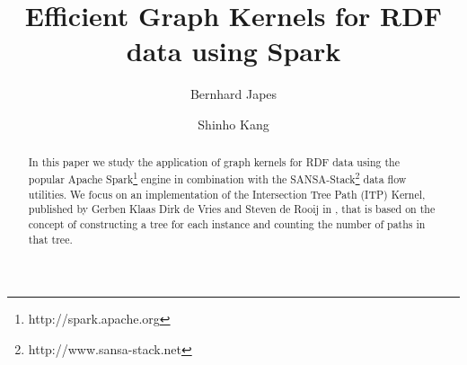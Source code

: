 \documentclass{easychair}
\begin{document}
%
\title{Efficient Graph Kernels for RDF data using Spark}



%
\author{
Bernhard Japes
\and
Shinho Kang
}




\clearpage

\maketitle

\begin{abstract}
In this paper we study the application of graph kernels for RDF data using the popular Apache Spark\footnote{http://spark.apache.org} engine in combination with the SANSA-Stack\footnote{http://www.sansa-stack.net} data flow utilities.
We focus on an implementation of the Intersection Tree Path (ITP) Kernel, published by Gerben Klaas Dirk de Vries and Steven de Rooij in \cite{FGK}, that is based on the concept of constructing a tree for each instance and counting the number of paths in that tree.
\end{abstract}

\setcounter{tocdepth}{2}
\pagestyle{empty}
\end{document}
